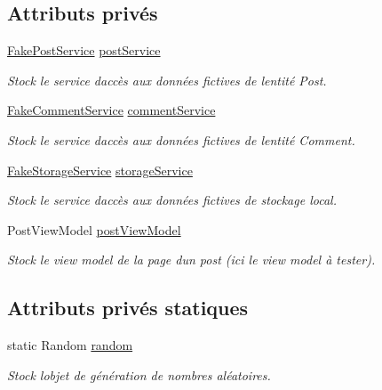 \subsection*{Attributs privés}
\begin{DoxyCompactItemize}
\item 
\hyperlink{class_boxes_1_1_tests_1_1_mock_1_1_services_1_1_fake_post_service}{Fake\+Post\+Service} \hyperlink{class_boxes_1_1_tests_1_1_post_view_model_tests_a87396114bbaa5bc138175b2f9e88b08e}{post\+Service}
\begin{DoxyCompactList}\small\item\em Stock le service d\textquotesingle{}accès aux données fictives de l\textquotesingle{}entité Post. \end{DoxyCompactList}\item 
\hyperlink{class_boxes_1_1_tests_1_1_mock_1_1_services_1_1_fake_comment_service}{Fake\+Comment\+Service} \hyperlink{class_boxes_1_1_tests_1_1_post_view_model_tests_ad667ed47cc2994a7b71d54116bc80fcf}{comment\+Service}
\begin{DoxyCompactList}\small\item\em Stock le service d\textquotesingle{}accès aux données fictives de l\textquotesingle{}entité Comment. \end{DoxyCompactList}\item 
\hyperlink{class_boxes_1_1_tests_1_1_mock_1_1_services_1_1_fake_storage_service}{Fake\+Storage\+Service} \hyperlink{class_boxes_1_1_tests_1_1_post_view_model_tests_a67b486930efd04ec1543f6977ae0fcab}{storage\+Service}
\begin{DoxyCompactList}\small\item\em Stock le service d\textquotesingle{}accès aux données fictives de stockage local. \end{DoxyCompactList}\item 
Post\+View\+Model \hyperlink{class_boxes_1_1_tests_1_1_post_view_model_tests_a471768650b52ebd29118640e121e1793}{post\+View\+Model}
\begin{DoxyCompactList}\small\item\em Stock le view model de la page d\textquotesingle{}un post (ici le view model à tester). \end{DoxyCompactList}\end{DoxyCompactItemize}
\subsection*{Attributs privés statiques}
\begin{DoxyCompactItemize}
\item 
static Random \hyperlink{class_boxes_1_1_tests_1_1_post_view_model_tests_a0178160fe934f0058e0bb8cf3488a11a}{random}
\begin{DoxyCompactList}\small\item\em Stock l\textquotesingle{}objet de génération de nombres aléatoires. \end{DoxyCompactList}\end{DoxyCompactItemize}


